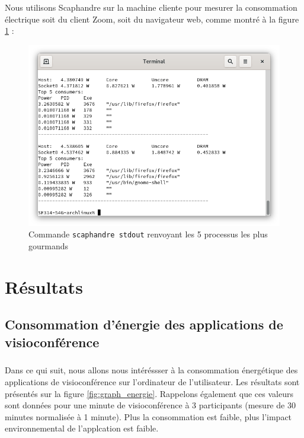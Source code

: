 \documentclass[11pt,a4paper]{report}
\begin{document}
Nous utilisons Scaphandre sur la machine cliente pour mesurer la consommation électrique soit du client Zoom, soit du navigateur web, comme montré à la figure \ref{fig:scaph} :
\begin{figure}[!h]
    \centering
    \includegraphics[scale=0.5]{capture_scaphandre.png}
    \caption{Commande \texttt{scaphandre stdout} renvoyant les 5 processus les plus gourmands}
    \label{fig:scaph}
\end{figure}



\chapter{Résultats}

\section{Consommation d'énergie des applications de visioconférence}

\paragraph{}
Dans ce qui suit, nous allons nous intéréssser à la consommation énergétique des applications de visioconférence sur l'ordinateur de l'utilisateur. Les résultats sont présentés sur la figure \ref{fig:graph_energie}. Rappelons également que ces valeurs sont données pour une minute de visioconférence à 3 participants (mesure de 30 minutes normalisée à 1 minute). Plus la consommation est faible, plus l'impact environnemental de l'applcation est faible.
\end{document}
